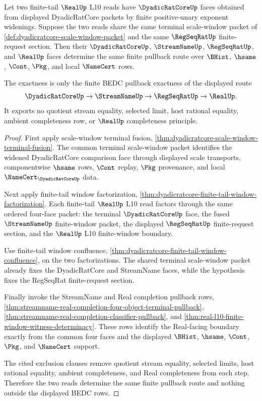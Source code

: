 \begin{theorem}
\label{thm:dyadicratcore-finite-tail-scale-window-pullback-exactness}
Let two finite-tail $\RealUp$ L10 reads have $\DyadicRatCoreUp$ faces obtained from displayed DyadicRatCore packets by finite positive-unary exponent widenings. Suppose the two reads share the same terminal scale-window packet of \autoref{def:dyadicratcore-scale-window-packet} and the same $\RegSeqRatUp$ finite-request section. Then their $\DyadicRatCoreUp$, $\StreamNameUp$, $\RegSeqRatUp$, and $\RealUp$ faces determine the same finite pullback route over $\BHist$, $\hsame$, $\Cont$, $\Pkg$, and local $\NameCert$ rows.

The exactness is only the finite BEDC pullback exactness of the displayed route
$$
\DyadicRatCoreUp \to \StreamNameUp \to \RegSeqRatUp \to \RealUp.
$$
It exports no quotient stream equality, selected limit, host rational equality, ambient completeness row, or $\RealUp$ completeness principle.
\end{theorem}
\begin{proof}
First apply scale-window terminal fusion, \autoref{thm:dyadicratcore-scale-window-terminal-fusion}. The common terminal scale-window packet identifies the widened DyadicRatCore comparison face through displayed scale transports, componentwise $\hsame$ rows, $\Cont$ replay, $\Pkg$ provenance, and local $\NameCert_{\DyadicRatCoreUp}$ data.

Next apply finite-tail window factorization, \autoref{thm:dyadicratcore-finite-tail-window-factorization}. Each finite-tail $\RealUp$ L10 read factors through the same ordered four-face packet: the terminal $\DyadicRatCoreUp$ face, the fused $\StreamNameUp$ finite-window packet, the displayed $\RegSeqRatUp$ finite-request section, and the $\RealUp$ L10 finite-window boundary.

Use finite-tail window confluence, \autoref{thm:dyadicratcore-finite-tail-window-confluence}, on the two factorizations. The shared terminal scale-window packet already fixes the DyadicRatCore and StreamName faces, while the hypothesis fixes the RegSeqRat finite-request section.

Finally invoke the StreamName and Real completion pullback rows, \autoref{thm:streamname-real-completion-four-object-terminal-pullback}, \autoref{thm:streamname-real-completion-classifier-pullback}, and \autoref{thm:real-l10-finite-window-witness-determinacy}. These rows identify the Real-facing boundary exactly from the common four faces and the displayed $\BHist$, $\hsame$, $\Cont$, $\Pkg$, and $\NameCert$ support.

The cited exclusion clauses remove quotient stream equality, selected limits, host rational equality, ambient completeness, and Real completeness from each step. Therefore the two reads determine the same finite pullback route and nothing outside the displayed BEDC rows.
\end{proof}

